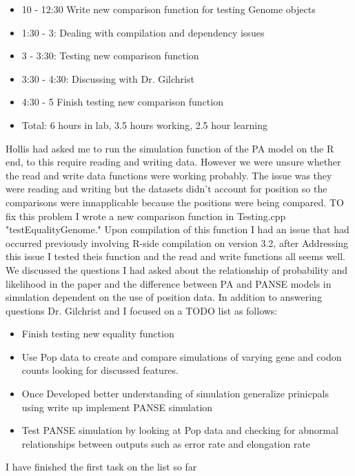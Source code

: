 \documentclass[12pt,hyperref]{labbook}
\begin{document}
\begin{itemize}
    \item 10 - 12:30 Write new comparison function for testing Genome objects
    \item 1:30 - 3: Dealing with compilation and dependency issues
    \item 3 - 3:30: Testing new comparison function
    \item 3:30 - 4:30: Discussing with Dr. Gilchrist
    \item 4:30 - 5 Finish testing new comparison function
    \item Total: 6 hours in lab, 3.5 hours working, 2.5 hour learning
\end{itemize}
Hollis had asked me to run the simulation function of the PA model on the R end, to this require reading and writing data. However we were unsure whether the read and write data functions were working probably. The issue was they were reading and writing but the datasets didn't account for position so the comparisons were innapplicable because the positions were being compared. TO fix this problem I wrote a new comparison function in Testing.cpp "testEqualityGenome." Upon compilation
of this function I had an issue that had occurred previously involving R-side compilation on version 3.2, after Addressing this issue I tested theis function and the read and write functions all seems well.
We discussed the questions I had asked about the relationship of probability and likelihood in the paper and the difference between PA and PANSE models in simulation dependent on the use of position data. In addition to answering questions Dr. Gilchrist and I focused on a TODO list as follows:
\begin{itemize}
    \item Finish testing new equality function
    \item Use Pop data to create and compare simulations of varying gene and codon counts looking for discussed features.
    \item Once Developed better understanding of simulation generalize prinicpals using write up implement PANSE simulation
    \item Test PANSE simulation by looking at Pop data and checking for abnormal relationships between outputs such as error rate and elongation rate
\end{itemize}
I have finished the first task on the list so far
\end{document}
